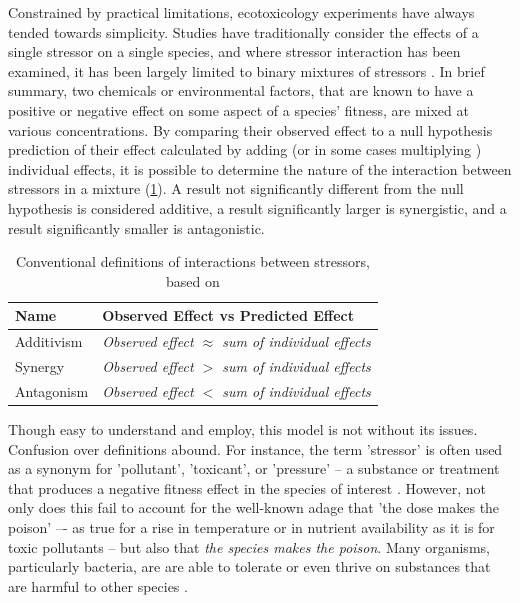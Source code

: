 \documentclass[final,1p,times]{elsarticle}
\begin{document}
Constrained by practical limitations, ecotoxicology experiments have always tended towards simplicity. Studies have traditionally consider the effects of a single stressor on a single species, and where stressor interaction has been examined, it has been largely limited to binary mixtures of stressors \cite{Peterson2017}. In brief summary, two chemicals or environmental factors, that are known to have a positive or negative effect on some aspect of a species' fitness, are mixed at various concentrations. By comparing their observed effect to a null hypothesis prediction of their effect calculated by adding (or in some cases multiplying \cite{Schafer2018}) individual effects, it is possible to determine the nature of the interaction between stressors in a mixture (\cref{tab:simple_interactions}). A result not significantly different from the null hypothesis is considered additive, a result significantly larger is synergistic, and a result significantly smaller is antagonistic. 

\begin{table}[ht]
\centering
\begin{tabular}{l l}
\toprule 
\textbf{Name} & \textbf{Observed Effect vs Predicted Effect} \\
\midrule
\rowcolor{gggrey}   Additivism      &   \textit{Observed effect $\approx$ sum of individual effects} \\
                    Synergy         &   \textit{Observed effect $>$ sum of individual effects} \\
\rowcolor{gggrey}   Antagonism      &   \textit{Observed effect $<$ sum of individual effects} \\
\bottomrule
\end{tabular}
\caption{Conventional definitions of interactions between stressors, based on \citet{Bliss1939}}
\label{tab:simple_interactions}
\end{table}

Though easy to understand and employ, this model is not without its issues. Confusion over definitions abound. For instance, the term 'stressor' is often used as a synonym for 'pollutant', 'toxicant', or 'pressure' -- a substance or treatment that produces a negative fitness effect in the species of interest \cite{Piggott2015}. However, not only does this fail to account for the well-known adage that 'the dose makes the poison'\cite{OGParacelsus} –- as true for a rise in temperature or in nutrient availability as it is for toxic pollutants -- but also that \textit{the species makes the poison}. Many organisms, particularly bacteria, are are able to tolerate or even thrive on substances that are harmful to other species \cite{Malik2004,Gadd2009}. 
\end{document}
